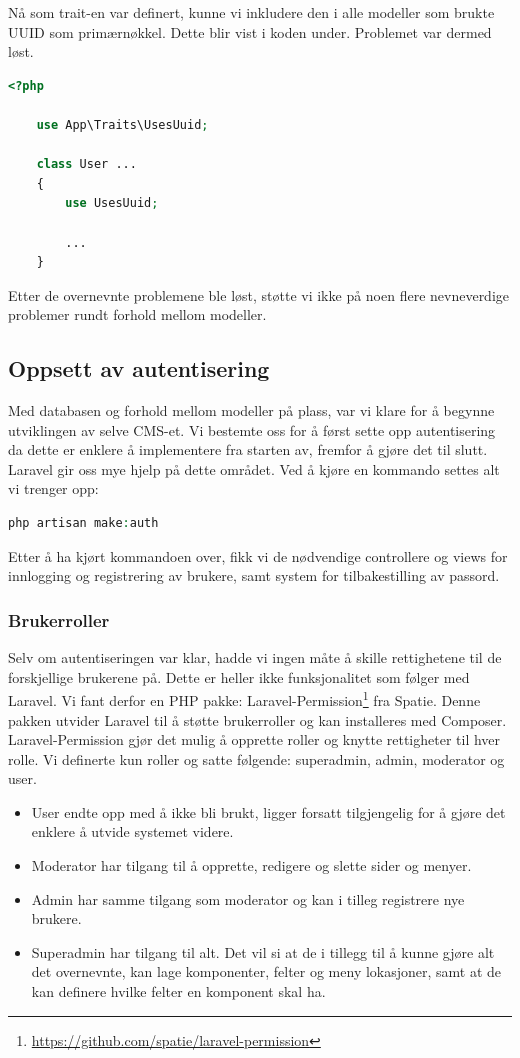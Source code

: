 Nå som trait-en var definert, kunne vi inkludere den i alle modeller som brukte UUID som primærnøkkel. Dette blir vist i koden under. Problemet var dermed løst.
\begin{lstlisting}[caption={Bruk av UUID trait i modell}, language=PHP]
    <?php

    use App\Traits\UsesUuid;

    class User ...
    {
        use UsesUuid;

        ...
    }
\end{lstlisting}

Etter de overnevnte problemene ble løst, støtte vi ikke på noen flere nevneverdige problemer rundt forhold mellom modeller.

\subsection{Oppsett av autentisering}
Med databasen og forhold mellom modeller på plass, var vi klare for å begynne utviklingen av selve CMS-et. Vi bestemte oss for å først sette opp autentisering da dette er enklere å implementere fra starten av, fremfor å gjøre det til slutt.
Laravel gir oss mye hjelp på dette området. Ved å kjøre en kommando settes alt vi trenger opp:
\begin{lstlisting}[language=PHP]
    php artisan make:auth
\end{lstlisting}
Etter å ha kjørt kommandoen over, fikk vi de nødvendige controllere og views for innlogging og registrering av brukere, samt system for tilbakestilling av passord.

\subsubsection{Brukerroller}
Selv om autentiseringen var klar, hadde vi ingen måte å skille rettighetene til de forskjellige brukerene på. Dette er heller ikke funksjonalitet som følger med Laravel. Vi fant derfor en PHP pakke: Laravel-Permission\footnote{\url{https://github.com/spatie/laravel-permission}} fra Spatie. Denne pakken utvider Laravel til å støtte brukerroller og kan installeres med Composer. Laravel-Permission gjør det mulig å opprette roller og knytte rettigheter til hver rolle. Vi definerte kun roller og satte følgende: superadmin, admin, moderator og user.
\begin{itemize}
    \item User endte opp med å ikke bli brukt, ligger forsatt tilgjengelig for å gjøre det enklere å utvide systemet videre.
    \item Moderator har tilgang til å opprette, redigere og slette sider og menyer.
    \item Admin har samme tilgang som moderator og kan i tilleg registrere nye brukere.
    \item Superadmin har tilgang til alt. Det vil si at de i tillegg til å kunne gjøre alt det overnevnte, kan lage komponenter, felter og meny lokasjoner, samt at de kan definere hvilke felter en komponent skal ha.
\end{itemize}


